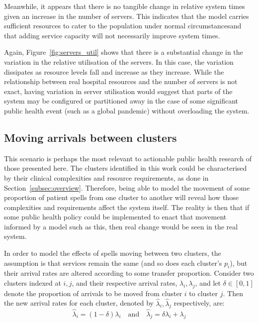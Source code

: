 Meanwhile, it appears that there is no tangible change in relative system times
given an increase in the number of servers. This indicates that the model
carries sufficient resources to cater to the population under normal
circumstancesand that adding service capacity will not necessarily improve
system times.

Again, Figure~\ref{fig:servers_util} shows that there is a substantial change in
the variation in the relative utilisation of the servers. In this case, the
variation dissipates as resource levels fall and increase as they increase.
While the relationship between real hospital resources and the number of servers
is not exact, having variation in server utilisation would suggest that parts of
the system may be configured or partitioned away in the case of some significant
public health event (such as a global pandemic) without overloading the system.


\subsection{Moving arrivals between clusters}\label{subsec:moving}

This scenario is perhaps the most relevant to actionable public health research
of those presented here. The clusters identified in this work could be
characterised by their clinical complexities and resource requirements, as done
in Section~\ref{subsec:overview}. Therefore, being able to model the movement of
some proportion of patient spells from one cluster to another will reveal how
those complexities and requirements affect the system itself. The reality is
then that if some public health policy could be implemented to enact that
movement informed by a model such as this, then real change would be seen in the
real system.

In order to model the effects of spells moving between two clusters, the
assumption is that services remain the same (and so does each cluster's
\(p_i\)), but their arrival rates are altered according to some transfer
proportion. Consider two clusters indexed at \(i, j\), and their respective
arrival rates, \(\lambda_i, \lambda_j\), and let \(\delta \in [0, 1]\) denote
the proportion of arrivals to be moved from cluster \(i\) to cluster \(j\). Then
the new arrival rates for each cluster, denoted by \(\hat\lambda_i,
\hat\lambda_j\) respectively, are:
\begin{equation}\label{eq:moving}
    \hat\lambda_i = \left(1 - \delta\right) \lambda_i
    \quad \text{and} \quad
    \hat\lambda_j = \delta\lambda_i + \lambda_j
\end{equation}

